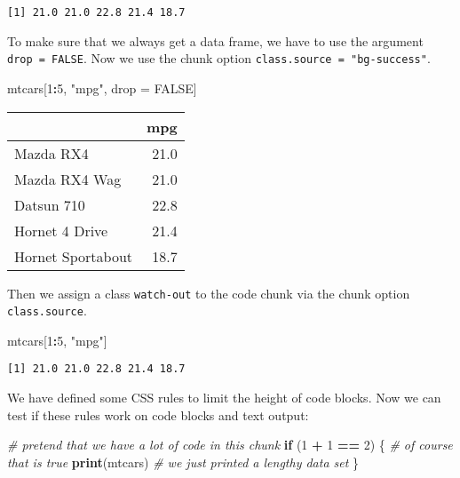 \documentclass[
  french,
]{article}
\newenvironment{Shaded}{\begin{snugshade}}{\end{snugshade}}
\newcommand{\CommentTok}[1]{\textcolor[rgb]{0.56,0.35,0.01}{\textit{#1}}}
\newcommand{\ControlFlowTok}[1]{\textcolor[rgb]{0.13,0.29,0.53}{\textbf{#1}}}
\newcommand{\DecValTok}[1]{\textcolor[rgb]{0.00,0.00,0.81}{#1}}
\newcommand{\KeywordTok}[1]{\textcolor[rgb]{0.13,0.29,0.53}{\textbf{#1}}}
\newcommand{\NormalTok}[1]{#1}
\newcommand{\OperatorTok}[1]{\textcolor[rgb]{0.81,0.36,0.00}{\textbf{#1}}}
\newcommand{\OtherTok}[1]{\textcolor[rgb]{0.56,0.35,0.01}{#1}}
\newcommand{\StringTok}[1]{\textcolor[rgb]{0.31,0.60,0.02}{#1}}
\begin{document}
\begin{verbatim}
[1] 21.0 21.0 22.8 21.4 18.7
\end{verbatim}

To make sure that we always get a data frame, we have to use
the argument \texttt{drop\ =\ FALSE}. Now we use the chunk option
\texttt{class.source\ =\ "bg-success"}.

\begin{Shaded}
\begin{Highlighting}[]
\NormalTok{mtcars[}\DecValTok{1}\OperatorTok{:}\DecValTok{5}\NormalTok{, }\StringTok{"mpg"}\NormalTok{, drop =}\StringTok{ }\OtherTok{FALSE}\NormalTok{]}
\end{Highlighting}
\end{Shaded}

\begin{tabular}{l|r}
\hline
  & mpg\\
\hline
Mazda RX4 & 21.0\\
\hline
Mazda RX4 Wag & 21.0\\
\hline
Datsun 710 & 22.8\\
\hline
Hornet 4 Drive & 21.4\\
\hline
Hornet Sportabout & 18.7\\
\hline
\end{tabular}

Then we assign a class \texttt{watch-out} to the code chunk via the
chunk option \texttt{class.source}.

\begin{Shaded}
\begin{Highlighting}[]
\NormalTok{mtcars[}\DecValTok{1}\OperatorTok{:}\DecValTok{5}\NormalTok{, }\StringTok{"mpg"}\NormalTok{]}
\end{Highlighting}
\end{Shaded}

\begin{verbatim}
[1] 21.0 21.0 22.8 21.4 18.7
\end{verbatim}

We have defined some CSS rules to limit the height of
code blocks. Now we can test if these rules work on code
blocks and text output:

\begin{Shaded}
\begin{Highlighting}[]
\CommentTok{# pretend that we have a lot of code in this chunk}
\ControlFlowTok{if}\NormalTok{ (}\DecValTok{1} \OperatorTok{+}\StringTok{ }\DecValTok{1} \OperatorTok{==}\StringTok{ }\DecValTok{2}\NormalTok{) \{}
  \CommentTok{# of course that is true}
  \KeywordTok{print}\NormalTok{(mtcars)}
  \CommentTok{# we just printed a lengthy data set}
\NormalTok{\}}
\end{Highlighting}
\end{Shaded}
\end{document}
